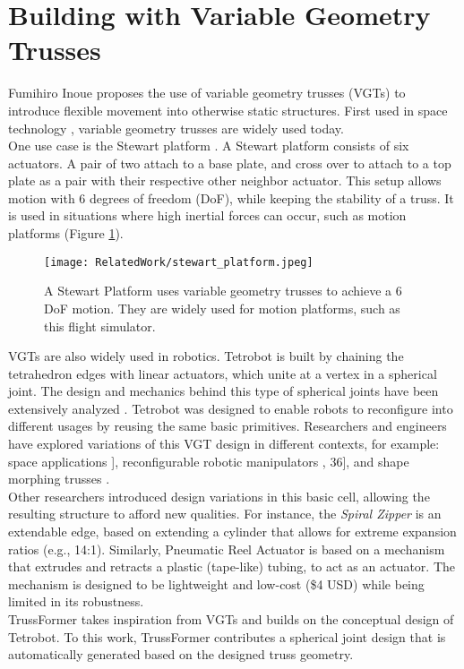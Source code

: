 \section{Building with Variable Geometry Trusses}
Fumihiro Inoue \cite{inoue:2008} proposes the use of variable geometry trusses (VGTs) \cite{reinholtz:1990, rhodes:1985, spinos:2017} to introduce flexible movement into otherwise static structures. First used in space technology \cite{huang:1996}, variable geometry trusses are widely used today.\\
One use case is the Stewart platform \cite{stewart:1965}. A Stewart platform consists of six actuators. A pair of two attach to a base plate, and cross over to attach to a top plate as a pair with their respective other neighbor actuator. This setup allows motion with 6 degrees of freedom (DoF), while keeping the stability of a truss. It is used in situations where high inertial forces can occur, such as motion platforms (Figure \ref{fig:stewart_platform}).\\
\begin{figure}[h!]
    \texttt{[image: RelatedWork/stewart\_platform.jpeg]}
    \centering
    \caption{A Stewart Platform uses variable geometry trusses to achieve a 6 DoF motion. They are widely used for motion platforms, such as this flight simulator.}
    \label{fig:stewart_platform}
\end{figure}
VGTs are also widely used in robotics. Tetrobot \cite{hamlin:2013, hamlin:1997} is built by chaining the tetrahedron edges with linear actuators, which unite at a vertex in a spherical joint. The design and mechanics behind this type of spherical joints have been extensively analyzed \cite{sofla:2009, spinos2:2017}. Tetrobot was designed to enable robots to reconfigure into different usages by reusing the same basic primitives. Researchers and engineers have explored variations of this VGT design in different contexts, for example: space applications \cite{reinholtz:1990}], reconfigurable robotic manipulators \cite{reinholtz:1990, hamlin:2013} , 36], and shape morphing trusses \cite{sofla:2009}.\\
Other researchers introduced design variations in this basic cell, allowing the resulting structure to afford new qualities. For instance, the \textit{Spiral Zipper} \cite{collins:2016} is an extendable edge, based on extending a cylinder that allows for extreme expansion ratios (e.g., 14:1). Similarly, Pneumatic Reel Actuator \cite{hammond:2017} is based on a mechanism that extrudes and retracts a plastic (tape-like) tubing, to act as an actuator. The mechanism is designed to be lightweight and low-cost (\$4 USD) while being limited in its robustness.\\
TrussFormer takes inspiration from VGTs and builds on the conceptual design of Tetrobot. To this work, TrussFormer contributes a spherical joint design that is automatically generated based on the designed truss geometry.

